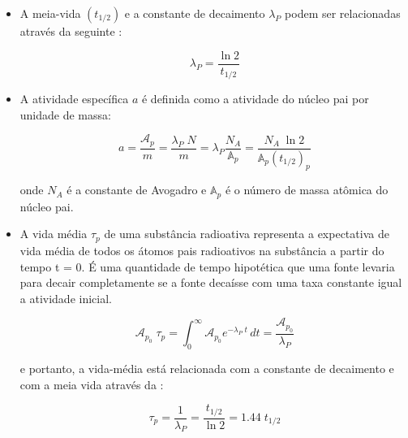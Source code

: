 \documentclass[11pt,a4paper]{article}
\begin{document}
\begin{itemize}
                \item A meia-vida $(t_{1/2})$ e a constante de decaimento $\lambda_P$ podem ser relacionadas através da seguinte :
                
                    \begin{equation}
                        \lambda_P = \frac{\ln 2}{t_{1/2}}
                    \end{equation}

                \item A atividade específica $a$ é definida como a atividade do núcleo pai por unidade de massa:
                
                    \begin{equation}
                        a = \frac{\mathcal{A}_p}{m} = \frac{\lambda_P \; N}{m} = 
                        \lambda_P \frac{N_A}{\mathbb{A}_p} = \frac{N_A \; \ln 2}{\mathbb{A}_p (t_{1/2})_p}
                    \end{equation}
                
                    onde $N_A$ é a constante de Avogadro e $\mathbb{A}_p$ é o número de massa atômica do núcleo pai.
                
                \item A vida média $\tau_p$ de uma substância radioativa representa a expectativa de vida média de todos os átomos pais radioativos na substância a partir do tempo t = 0. É uma quantidade de tempo hipotética que uma fonte levaria para decair completamente se a fonte decaísse com uma taxa constante igual a atividade inicial.
                
                    \begin{equation}
                        \mathcal{A}_{p_0} \; \tau_p = 
                        \int_{0}^{\infty} \mathcal{A}_{p_0} e^{-\lambda_P \; t} \,dt = 
                        \frac{\mathcal{A}_{p_0}}{\lambda_P}
                    \end{equation}

                e portanto, a vida-média está relacionada com a constante de decaimento e com a meia vida através da :

                    \begin{equation}
                        \tau_p = \frac{1}{\lambda_P} = \frac{t_{1/2}}{\ln 2} = 1.44 \; t_{1/2}
                    \end{equation}
            \end{itemize}
\end{document}
